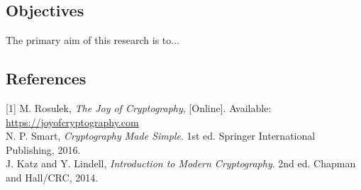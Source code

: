 \documentclass[a0,portrait]{a0poster}
\newcommand{\zero}{\textcolor{red}{\texttt{0}}}
\newcommand{\one}{\textcolor{red}{\texttt{1}}}
\newcommand{\binaryfield}{\set{\zero,\one}}
\newcommand{\indexbit}{\texttt{Idx}}
\newcommand{\outbit}{\texttt{Out}}
\begin{document}
\begin{multicols}{2}
\begin{sectionbox}
\begin{center}
\begin{minipage}{.7\textwidth}
\begin{flushright}
					\end{flushright}
				\end{minipage}
			\end{center}
		\end{sectionbox}
		
		\begin{sectionbox}
			\section*{Objectives}
			The primary aim of this research is to...
			\lipsum[1-3]
		\end{sectionbox}
		
		\begin{sectionbox}
			\section*{\textcolor{MainColor}{References}}
			[1] M. Rosulek, \textit{The Joy of Cryptography}, [Online]. Available: \url{https://joyofcryptography.com}\\
			\text{[2]} N. P. Smart, \textit{Cryptography Made Simple}. 1st ed. Springer International Publishing, 2016.\\
			\text{[3]} J. Katz and Y. Lindell, \textit{Introduction to Modern Cryptography}. 2nd ed. Chapman and Hall/CRC, 2014.
		\end{sectionbox}
	\end{multicols}
	
\end{document}
